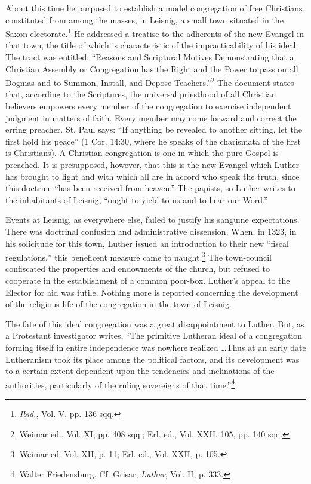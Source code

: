 About this time he purposed to establish a model congregation of free
Christians constituted from among the masses, in Leisnig, a small town situated
in the Saxon electorate.\footnote{\textit{Ibid.}, Vol. V, pp. 136 sqq.}
He addressed a treatise to the adherents of
the new Evangel in that town, the title of which is characteristic of the
impracticability of his ideal. The tract was entitled: “Reasons and Scriptural
Motives Demonstrating that a Christian Assembly or Congregation has the
Right and the Power to pass on all Dogmas and to Summon, Install, and
Depose Teachers.”\footnote{Weimar ed., Vol. XI, pp. 408 sqq.; Erl. ed., Vol. XXII, 105, pp. 140 sqq.}
The document states that, according to the Scriptures,
the universal priesthood of all Christian believers empowers every member
of the congregation to exercise independent judgment in matters of faith.
Every member may come forward and correct the erring preacher. St. Paul
says: “If anything be revealed to another sitting, let the first hold his
peace” (1 Cor. 14:30, where he speaks of the charismata of the first is
Christians). A Christian congregation is one in which the pure Gospel is
preached. It is presupposed, however, that this is the new Evangel which
Luther has brought to light and with which all are in accord who
speak the truth, since this doctrine ``has been received from heaven.''
The papists, so Luther writes to the inhabitants of Leisnig, ``ought to
yield to us and to hear our Word.''

Events at Leisnig, as everywhere else,
failed to justify his sanguine expectations. There was doctrinal confusion
and administrative dissension. When, in 1323, in his solicitude for this
town, Luther issued an introduction to their new ``fiscal regulations,''
this beneficent measure came to naught.\footnote{Weimar ed. Vol. XII, p. 11; Erl. ed., Vol. XXII, p. 105.}
The town-council confiscated the properties and endowments of the church,
but refused to cooperate in the establishment of a common poor-box.
Luther’s appeal to the Elector for aid was futile. Nothing more is reported
concerning the development of the religious life of the congregation in the
town of Leisnig.

The fate of this ideal congregation was a great disappointment to
Luther. But, as a Protestant investigator writes, “The primitive
Lutheran ideal of a congregation forming itself in entire independence
was nowhere realized \dots Thus at an early date Lutheranism took
its place among the political factors, and its development was to a
certain extent dependent upon the tendencies and inclinations of the
authorities, particularly of the ruling sovereigns of that time.”\footnote
{Walter Friedensburg, Cf. Grisar, \textit{Luther}, Vol. II, p. 333.}
